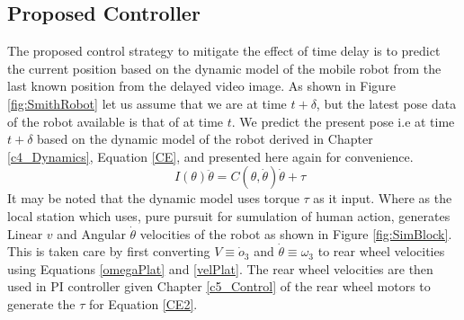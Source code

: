\subsection{Proposed Controller}
The proposed control strategy to mitigate the effect of time delay is to predict the current position based on the dynamic model of the mobile robot from the last known position from the delayed video image.  As shown in Figure \ref{fig:SmithRobot} let us assume that we are at time $t+\delta$, but the latest pose  data of the robot available is that of at time $t$. We predict the present pose i.e at time $t+\delta$ based on the dynamic model  of the robot derived in Chapter \ref{c4_Dynamics}, Equation \ref{CE}, and presented here again for convenience. 
\begin{equation}
\label{CE2}
\quad I(\theta)\ddot{\theta}=C(\theta,\dot{\theta})\dot{\theta}+\tau
\end{equation}
It may be noted that the dynamic model uses torque $\tau$ as it input. Where as the local station which uses, pure pursuit for sumulation of  human action,   generates Linear  $v$ and Angular $\dot\theta$  velocities of the robot as shown in Figure \ref{fig:SimBlock}. This is taken care by first converting $V \equiv\dot o_3$ and $\dot\theta\equiv\omega_3$ to rear wheel velocities using Equations \ref{omegaPlat} and \ref{velPlat}. The rear wheel velocities  are then used in PI controller given Chapter \ref{c5_Control} of the rear wheel motors to generate the $\tau$ for Equation \ref{CE2}.

